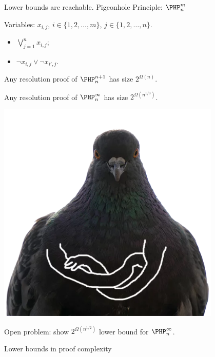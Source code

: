 \begin{frame}{Lower bounds are reachable. Pigeonhole Principle: $\PHP_{n}^{m}$}

    Variables: $x_{i, j}$, $i \in \{1, 2, \dots, m\}$, $j \in \{1, 2, \dots, n\}$.
    \vspace{0.1cm}

    \pause
    \begin{itemize}
        \item $\bigvee\limits_{j = 1}^{n} x_{i, j}$;
        \item $\neg x_{i, j} \lor \neg x_{i', j}$.
    \end{itemize}

    \pause

    \vspace{0.2cm}
    \begin{minipage}{0.3\linewidth}
        \centering
        
    \end{minipage}
    \pause
    \begin{minipage}{0.68\linewidth}
        \begin{theorem}[Haken 85]
            Any resolution proof of $\PHP_{n}^{n + 1}$ has size $2^{\Omega(n)}$. 
        \end{theorem}
        \pause
        \begin{theorem}
            Any resolution proof of $\PHP_{n}^{\infty}$ has size $2^{\Omega(n^{1 / 3})}$.
        \end{theorem}
        \pause
        \begin{minipage}{0.3\linewidth}
            \centering
            \includegraphics[width = 0.8\textwidth]{pics/pigeon3.png}
        \end{minipage}
        \begin{minipage}{0.67\linewidth}
            Open problem: show $2^{\Omega(n^{1 / 2})}$ lower bound for $\PHP_{n}^{\infty}$.
        \end{minipage}
    \end{minipage}
    
\end{frame}


\begin{frame}{Lower bounds in proof complexity}

    
    
\end{frame}